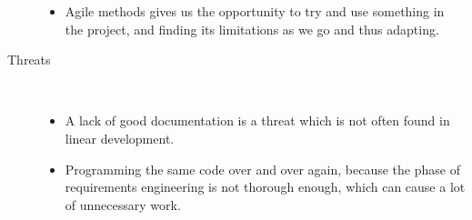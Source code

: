 \begin{description}
\begin{itemize}
		\item Agile methods gives us the opportunity to try and use something in the project, and finding its limitations as we go and thus adapting.
		\end{itemize}
	\item [Threats]\hfill\\
		\begin{itemize}
		\item A lack of good documentation is a threat which is not often found in linear development.
		\item Programming the same code over and over again, because the phase of requirements engineering is not thorough enough, which can cause a lot of unnecessary work.
		\end{itemize}
\end{description}